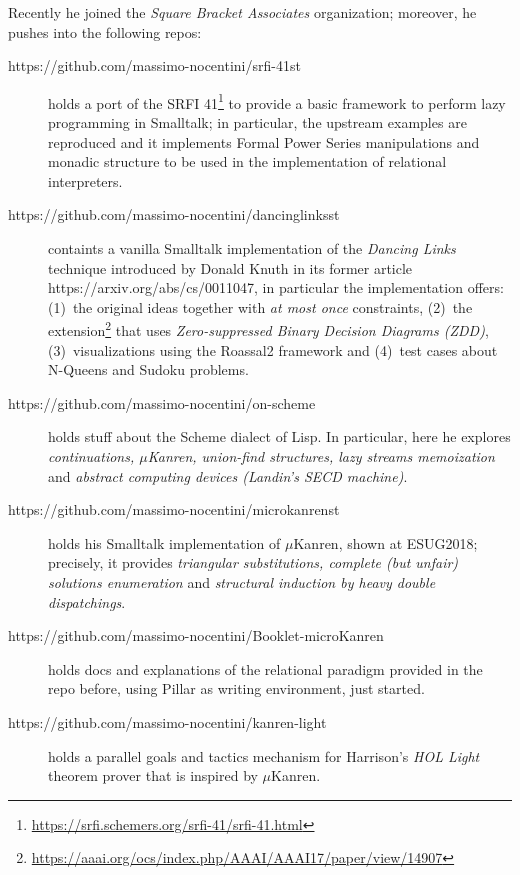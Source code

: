 \documentclass[a4paper]{article} %
\begin{document}
    Recently he joined the \textit{Square Bracket Associates} organization; moreover,
    he pushes into the following repos:
    \begin{description}
		
		\item[https://github.com/massimo-nocentini/srfi-41st] holds a port
		of the SRFI 41\footnote{\url{https://srfi.schemers.org/srfi-41/srfi-41.html}} to
		provide a basic framework to perform lazy programming in Smalltalk; in particular,
		the upstream examples are reproduced and it implements Formal Power Series manipulations
		and monadic structure to be used in the implementation of relational interpreters.
		
        \item[https://github.com/massimo-nocentini/dancinglinksst] containts
		a vanilla Smalltalk implementation of the \emph{Dancing Links} technique introduced 
		by Donald Knuth in its former article https://arxiv.org/abs/cs/0011047, in particular
		the implementation offers: (1)~the original ideas together with \emph{at most once} 
		constraints, (2)~the extension\footnote{\url{https://aaai.org/ocs/index.php/AAAI/AAAI17/paper/view/14907}} that uses \emph{Zero-suppressed Binary Decision Diagrams (ZDD)}, (3)~visualizations 
		using the Roassal2 framework and (4)~test cases about N-Queens and Sudoku problems.
		
		\item[https://github.com/massimo-nocentini/on-scheme] holds stuff about
        the Scheme dialect of Lisp. In particular, here he explores
        \textit{continuations, $\mu$Kanren, union-find structures, lazy streams
        memoization} and \textit{abstract computing devices (Landin's SECD machine)}.

        \item[https://github.com/massimo-nocentini/microkanrenst] holds his
        Smalltalk implementation of $\mu$Kanren, shown at ESUG2018; precisely,
        it provides \textit{triangular substitutions, complete (but unfair)
        solutions enumeration} and \textit{structural induction by heavy double
        dispatchings}.

        \item[https://github.com/massimo-nocentini/Booklet-microKanren] holds
        docs and explanations of the relational paradigm provided in the repo before,
        using Pillar as writing environment, just started.

        \item[https://github.com/massimo-nocentini/kanren-light] holds a
        parallel goals and tactics mechanism for Harrison's \textit{HOL Light}
        theorem prover that is inspired by $\mu$Kanren.


\end{description}
\end{document}
